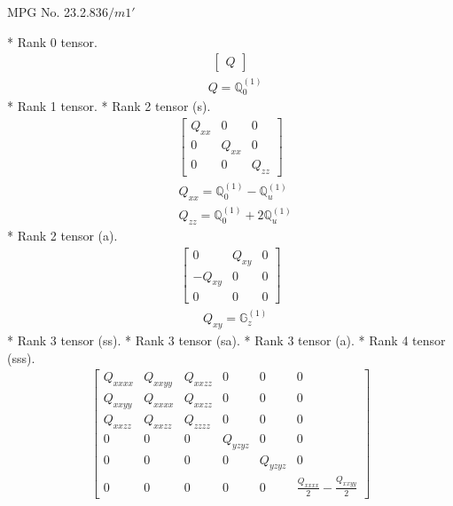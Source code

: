\documentclass[fleqn,8pt,landscape]{jsarticle}
\begin{document}
\setcounter{MaxMatrixCols}{32}

\renewcommand{\tablename}{Table~}
\renewcommand{\figurename}{Figure~}
\begin{center}
\LARGE
MPG No. 23.2.83\quad$6/m1'$
\end{center}
* Rank 0 tensor.
\begin{align*}
\begin{bmatrix} Q \end{bmatrix}
\end{align*}
\begin{align*}
& Q = \mathbb{Q}_{0}^{(1)}
\end{align*}
* Rank 1 tensor.
* Rank 2 tensor (s).
\begin{align*}
\begin{bmatrix} Q_{xx} & 0 & 0 \\ 0 & Q_{xx} & 0 \\ 0 & 0 & Q_{zz} \end{bmatrix}
\end{align*}
\begin{align*}
& Q_{xx} = \mathbb{Q}_{0}^{(1)} - \mathbb{Q}_{u}^{(1)} \\
& Q_{zz} = \mathbb{Q}_{0}^{(1)} + 2 \mathbb{Q}_{u}^{(1)}
\end{align*}
* Rank 2 tensor (a).
\begin{align*}
\begin{bmatrix} 0 & Q_{xy} & 0 \\ - Q_{xy} & 0 & 0 \\ 0 & 0 & 0 \end{bmatrix}
\end{align*}
\begin{align*}
& Q_{xy} = \mathbb{G}_{z}^{(1)}
\end{align*}
* Rank 3 tensor (ss).
* Rank 3 tensor (sa).
* Rank 3 tensor (a).
* Rank 4 tensor (sss).
\begin{align*}
\begin{bmatrix} Q_{xxxx} & Q_{xxyy} & Q_{xxzz} & 0 & 0 & 0 \\ Q_{xxyy} & Q_{xxxx} & Q_{xxzz} & 0 & 0 & 0 \\ Q_{xxzz} & Q_{xxzz} & Q_{zzzz} & 0 & 0 & 0 \\ 0 & 0 & 0 & Q_{yzyz} & 0 & 0 \\ 0 & 0 & 0 & 0 & Q_{yzyz} & 0 \\ 0 & 0 & 0 & 0 & 0 & \frac{Q_{xxxx}}{2} - \frac{Q_{xxyy}}{2} \end{bmatrix}
\end{align*}
\end{document}
